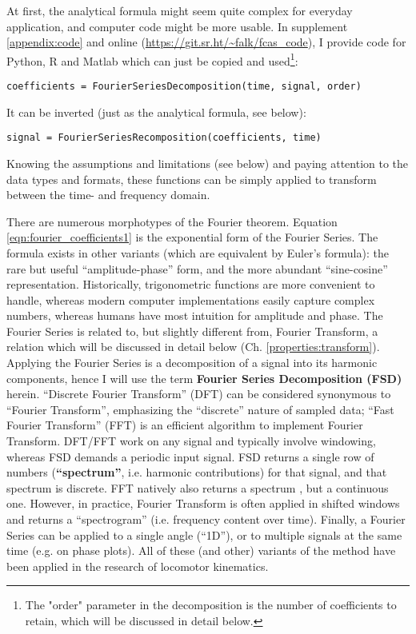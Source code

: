 At first, the analytical formula might seem quite complex for everyday application, and computer code might be more usable.
In supplement \ref{appendix:code} and online (\url{https://git.sr.ht/~falk/fcas_code}), I provide code for Python, R and Matlab which can just be copied and used\footnote{The "order" parameter in the decomposition is the number of coefficients to retain, which will be discussed in detail below.}:
\begin{lstlisting}
coefficients = FourierSeriesDecomposition(time, signal, order)
\end{lstlisting}

It can be inverted (just as the analytical formula, see below):
\begin{lstlisting}
signal = FourierSeriesRecomposition(coefficients, time)
\end{lstlisting}

Knowing the assumptions and limitations (see below) and paying attention to the data types and formats, these functions can be simply applied to transform between the time- and frequency domain.


\bigskip
There are numerous morphotypes of the Fourier theorem.
Equation \eqref{eqn:fourier_coefficients1} is the exponential form of the Fourier Series.
The formula exists in other variants (which are equivalent by Euler's formula): the rare but useful ``amplitude-phase'' form, and the more abundant ``sine-cosine'' representation.
Historically, trigonometric functions are more convenient to handle, whereas modern computer implementations easily capture complex numbers, whereas humans have most intuition for amplitude and phase.
The Fourier Series is related to, but slightly different from, Fourier Transform, a relation which will be discussed in detail below (Ch. \ref{properties:transform}).
Applying the Fourier Series is a decomposition of a signal into its harmonic components, hence I will use the term \textbf{Fourier Series Decomposition (FSD)} herein.
``Discrete Fourier Transform'' (DFT) can be considered synonymous to ``Fourier Transform'', emphasizing the ``discrete'' nature of sampled data; ``Fast Fourier Transform'' (FFT) is an efficient algorithm to implement Fourier Transform.
DFT/FFT work on any signal and typically involve windowing, whereas FSD demands a periodic input signal.
FSD returns a single row of numbers (\textbf{``spectrum''}, i.e. harmonic contributions) for that signal, and that spectrum is discrete.
FFT natively also returns a spectrum \citep{Welch1967}, but a continuous one.
However, in practice, Fourier Transform is often applied in shifted windows and returns a ``spectrogram'' (i.e. frequency content over time).
Finally, a Fourier Series can be applied to a single angle (``1D''), or to multiple signals at the same time (e.g. on phase plots).
All of these (and other) variants of the method have been applied in the research of locomotor kinematics.

